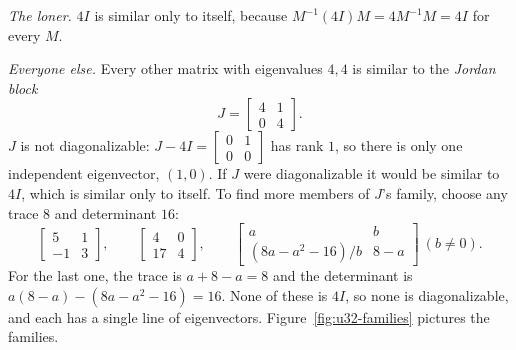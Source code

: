 \emph{The loner.} $4I$ is similar only to itself, because $M^{-1}(4I)M=4M^{-1}M=4I$ for every $M$.

\emph{Everyone else.} Every other matrix with eigenvalues $4,4$ is similar to the
\emph{Jordan block}
\[
  J=\begin{bmatrix}4&1\\0&4\end{bmatrix}.
\]
$J$ is not diagonalizable: $J-4I=\left[\begin{smallmatrix}0&1\\0&0\end{smallmatrix}\right]$ has rank $1$,
so there is only one independent eigenvector, $(1,0)$. If $J$ were diagonalizable it would be
similar to $4I$, which is similar only to itself. To find more members of $J$'s family, choose
any trace $8$ and determinant $16$:
\[
  \begin{bmatrix}5&1\\-1&3\end{bmatrix},\qquad
  \begin{bmatrix}4&0\\17&4\end{bmatrix},\qquad
  \begin{bmatrix}a&b\\(8a-a^2-16)/b&8-a\end{bmatrix}\ (b\ne0).
\]
For the last one, the trace is $a+8-a=8$ and the determinant is
$a(8-a)-(8a-a^2-16)=16$. None of these is $4I$, so none is diagonalizable, and each has a single
line of eigenvectors. Figure~\ref{fig:u32-families} pictures the families.

